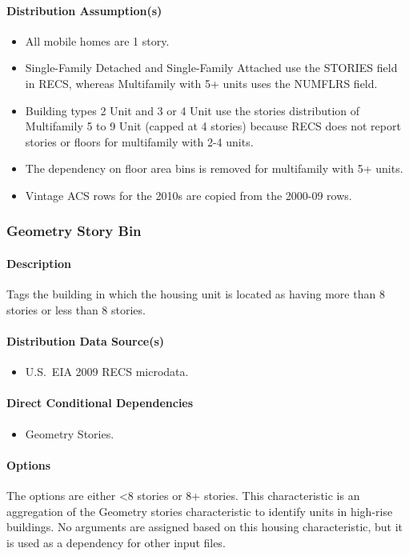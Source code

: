 \paragraph{Distribution Assumption(s)}
\begin{itemize}
    \item All mobile homes are 1 story.
    \item Single-Family Detached and Single-Family Attached use the STORIES field in RECS, whereas Multifamily with 5+ units uses the NUMFLRS field.
    \item Building types 2 Unit and 3 or 4 Unit use the stories distribution of Multifamily 5 to 9 Unit (capped at 4 stories) because RECS does not report stories or floors for multifamily with 2-4 units.
    \item The dependency on floor area bins is removed for multifamily with 5+ units.
    \item Vintage ACS rows for the 2010s are copied from the 2000-09 rows.
\end{itemize}

\subsubsection{Geometry Story Bin}
\paragraph{Description}
Tags the building in which the housing unit is located as having more than 8 stories or less than 8 stories.

\paragraph{Distribution Data Source(s)}
\begin{itemize}
    \item U.S.~EIA 2009 RECS microdata.
\end{itemize}

\paragraph{Direct Conditional Dependencies}
\begin{itemize}
    \item Geometry Stories.
\end{itemize}

\paragraph{Options}
The options are either <8 stories or 8+ stories. This characteristic is an aggregation of the Geometry stories characteristic to identify units in high-rise buildings. No arguments are assigned based on this housing characteristic, but it is used as a dependency for other input files.

